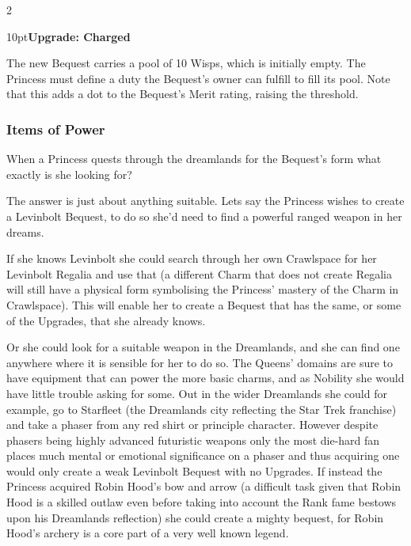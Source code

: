 \begin{multicols}{2}
\begin{myindentpar}{10pt}\textbf{Upgrade: Charged}

The new Bequest carries a pool of 10 Wisps, which is initially empty. The Princess must define a duty the Bequest's owner can fulfill to fill its pool. Note that this adds a dot to the Bequest's Merit rating, raising the threshold.

\end{myindentpar} 

\bigsidebarstart



\subsubsection*{Items of Power}

When a Princess quests through the dreamlands for the Bequest's form what exactly is she looking for? 

The answer is just about anything suitable. Lets say the Princess wishes to create a Levinbolt Bequest, to do so she'd need to find a powerful ranged weapon in her dreams. 

If she knows Levinbolt she could search through her own Crawlspace for her Levinbolt Regalia and use that (a different Charm that does not create Regalia will still have a physical form symbolising the Princess' mastery of the Charm in Crawlspace). This will enable her to create a Bequest that has the same, or some of the Upgrades, that she already knows. 

Or she could look for a suitable weapon in the Dreamlands, and she can find one anywhere where it is sensible for her to do so. The Queens' domains are sure to have equipment that can power the more basic charms, and as Nobility she would have little trouble asking for some. Out in the wider Dreamlands she could for example, go to Starfleet (the Dreamlands city reflecting the Star Trek franchise) and take a phaser from any red shirt or principle character. However despite phasers being highly advanced futuristic weapons only the most die-hard fan places much mental or emotional significance on a phaser and thus acquiring one would only create a weak Levinbolt Bequest with no Upgrades. If instead the Princess acquired Robin Hood's bow and arrow (a difficult task given that Robin Hood is a skilled outlaw even before taking into account the Rank fame bestows upon his Dreamlands reflection) she could create a mighty bequest, for Robin Hood's archery is a core part of a very well known legend. 


\end{multicols}
